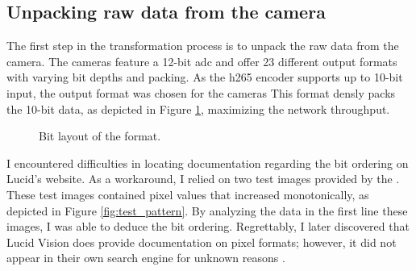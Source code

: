 \subsection {Unpacking raw data from the camera}
\label{sec:unpacking}
The first step in the transformation process is to unpack the raw data from the camera.
The \lucid cameras feature a 12-bit \gls{adc} and offer 23 different output formats with varying bit depths and packing.
As the \gls{h265} encoder supports up to 10-bit input, the  output format was chosen for the cameras \cite[17 ]{nvidiaNVIDIAJetsonAGX2019}
This format densly packs the 10-bit data, as depicted in Figure \ref{fig:mono10p}, maximizing the network throughput.

\begin{figure}[H]
    \centering
    \caption{Bit layout of the  format.}
    \label{fig:mono10p}
\end{figure}


I encountered difficulties in locating documentation regarding the bit ordering on Lucid's website.
As a workaround, I relied on two test images provided by the \cam.
These test images contained pixel values that increased monotonically, as depicted in Figure \ref{fig:test_pattern}.
By analyzing the data in the first line these images, I was able to deduce the bit ordering.
Regrettably, I later discovered that Lucid Vision does provide documentation on pixel formats; however, it did not appear in their own search engine for unknown reasons \cite{lucidvisionlabsPixelFormatsLUCID2020}.

